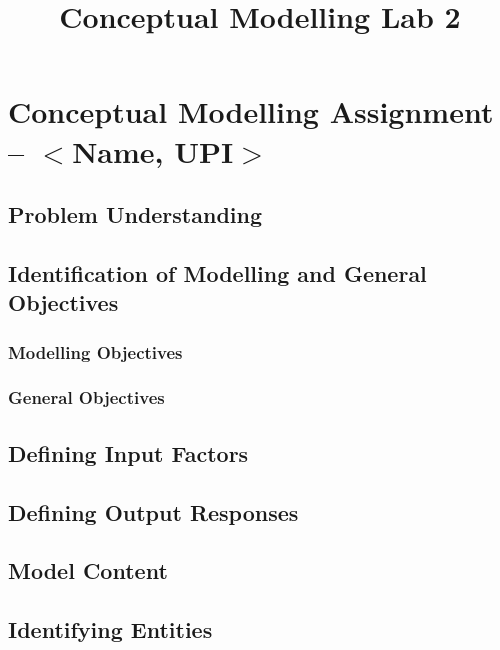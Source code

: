 \documentclass[]{article}
\title{Conceptual Modelling Lab 2}
\begin{document}
\vspace*{-0.08\textheight}

\section*{Conceptual Modelling Assignment -- $<$Name, UPI$>$}

\subsection*{Problem Understanding}

\vspace*{300pt}

\subsection*{Identification of Modelling and General Objectives}

\subsubsection*{Modelling Objectives}

\vspace*{64pt}

\subsubsection*{General Objectives}

\vspace*{32pt}

\subsection*{Defining Input Factors}

\vspace*{32pt}

\subsection*{Defining Output Responses}

\vspace*{32pt}

\subsection*{Model Content}

\subsection*{Identifying Entities}
\end{document}
